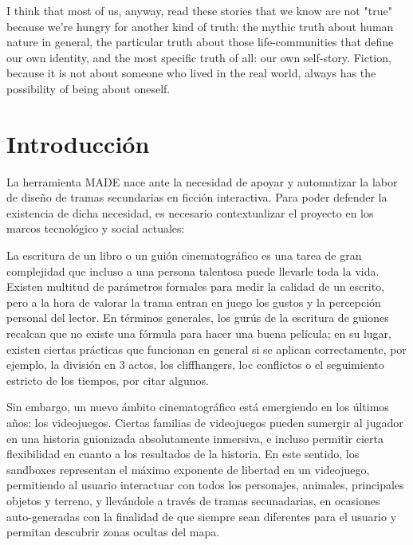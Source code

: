 
\begin{savequote}[50mm]
I think that most of us, anyway, read these stories that we know are not "true" because we're hungry for another kind of truth: the mythic truth about human nature in general, the particular truth about those life-communities that define our own identity, and the most specific truth of all: our own self-story. Fiction, because it is not about someone who lived in the real world, always has the possibility of being about oneself. 
\end{savequote}


\chapter{Introducción}


La herramienta MADE nace ante la necesidad de apoyar y automatizar la labor de diseño de tramas secundarias en ficción interactiva. Para poder defender la existencia de dicha necesidad, es necesario contextualizar el proyecto en los marcos tecnológico y social actuales:

La escritura de un libro o un guión cinematográfico es una tarea de gran complejidad que incluso a una persona talentosa puede llevarle toda la vida. Existen multitud de parámetros formales para medir la calidad de un escrito, pero a la hora de valorar la trama entran en juego los gustos y la percepción personal del lector. En términos generales, los gurús de la escritura de guiones recalcan que no existe una fórmula para hacer una buena película; en su lugar, existen ciertas prácticas que funcionan en general si se aplican correctamente, por ejemplo, la división en 3 actos, los cliffhangers, loc conflictos o el seguimiento estricto de los tiempos, por citar algunos.

Sin embargo, un nuevo ámbito cinematográfico está emergiendo en los últimos años: los videojuegos. Ciertas familias de videojuegos pueden sumergir al jugador en una historia guionizada absolutamente inmersiva, e incluso permitir cierta flexibilidad en cuanto a los resultados de la historia. En este sentido, los sandboxes representan el máximo exponente de libertad en un videojuego, permitiendo al usuario interactuar con todos los personajes, animales, principales objetos y terreno, y llevándole a través de tramas secunadarias, en ocasiones auto-generadas con la finalidad de que siempre sean diferentes para el usuario y permitan descubrir zonas ocultas del mapa.

